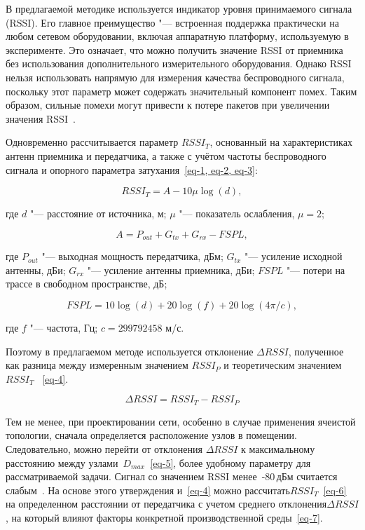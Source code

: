 В предлагаемой методике используется индикатор уровня принимаемого сигнала (RSSI). Его главное преимущество "--- встроенная поддержка практически на любом сетевом оборудовании, включая аппаратную платформу, используемую в эксперименте. Это означает, что можно получить значение RSSI от приемника без использования дополнительного измерительного оборудования. Однако RSSI нельзя использовать напрямую для измерения качества беспроводного сигнала, поскольку этот параметр может содержать значительный компонент помех. Таким образом, сильные помехи могут привести к потере пакетов при увеличении значения RSSI~\cite{8211460}.

Одновременно рассчитывается параметр $RSSI_T$, основанный на характеристиках антенн приемника и передатчика, а также с учётом частоты беспроводного сигнала и опорного параметра затухания~\cref{eq-1, eq-2, eq-3}:

\begin{equation}
	RSSI_T = A-10 \mu \log (d),
	\label{eq-1}
\end{equation}

\noindent где $d$ "--- расстояние от источника, м; $\mu$ "--- показатель ослабления, $\mu = 2$;

\begin{equation}
	A = P_{out} + G_{tx} + G_{rx} -FSPL,
	\label{eq-2}
\end{equation}

\noindent где $P_{out}$ "--- выходная мощность передатчика, дБм; $G_{tx}$ "--- усиление исходной антенны, дБи; $G_{rx}$ "--- усиление антенны приемника, дБи; $FSPL$ "--- потери на трассе в свободном пространстве, дБ;

\begin{equation}
	FSPL = 10 \log (d) +20 \log (f) +20 \log (4 \pi/c),
	\label{eq-3}
\end{equation}

\noindent где $f$ "--- частота, Гц; $c = 299792458$ м/с.

Поэтому в предлагаемом методе используется отклонение $\Delta RSSI$, полученное как разница между измеренным значением $RSSI_P$ и теоретическим значением $RSSI_T$~ \cref{eq-4}.

\begin{equation}
	\Delta RSSI = RSSI_T-RSSI_P
	\label{eq-4}
\end{equation}

Тем не менее, при проектировании сети, особенно в случае применения ячеистой топологии, сначала определяется расположение узлов в помещении. Следовательно, можно перейти от отклонения $\Delta RSSI$ к максимальному расстоянию между узлами~$D_{max}$~\cref{eq-5}, более удобному параметру для рассматриваемой задачи. Сигнал со значением RSSI менее~-80\,дБм считается слабым~\cite{mob_sig}. На основе этого утверждения и~\cref{eq-4} можно рассчитать$RSSI_T$~\cref{eq-6} на определенном расстоянии от передатчика с учетом среднего отклонения$\Delta RSSI$, на который влияют факторы конкретной производственной среды~\cref{eq-7}.

